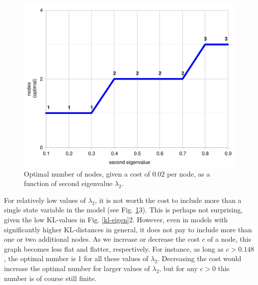 \documentclass[10pt,letterpaper]{article}
\newcommand{\red}[1]{\textcolor{Red}{#1}}
\begin{document}
 \begin{figure}[h]  \begin{center}
\includegraphics[scale=0.33]{kl-eigenvalue-7.pdf} \caption{Optimal number of nodes, given a cost of $0.02$ per node, as a function of second eigenvalue $\lambda_2$.} \end{center} 
\label{kl-eigen1}\end{figure}

\noindent For relatively low values of $\lambda_2$, it is not worth the cost to include more than a single state variable in the model (see Fig. \ref{kl-eigen1}3). This is perhaps not surprising, given the low KL-values in Fig. \ref{kl-eigen}2. However, even in models with significantly higher KL-distances in general, it does not pay to include more than one or two additional nodes. %
As we increase or decrease the cost $c$ of a node, this graph becomes less flat and flatter, respectively. For instance, as long as $c>0.148$, the optimal number is 1 for all these values of $\lambda_2$. Decreasing the cost would increase the optimal number for larger values of $\lambda_2$, but for any $c>0$ this number is of course still finite.
\end{document}
